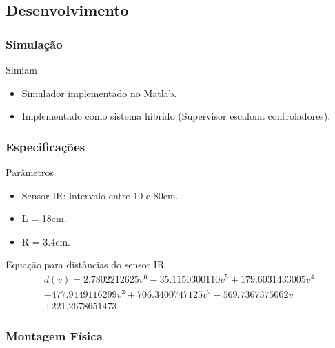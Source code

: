 \subsection{Desenvolvimento}

\begin{frame}
	\frametitle{Simulação}
	\begin{block}{Simiam}
		\begin{itemize}
		  \item Simulador implementado no Matlab.
		  \item Implementado como sistema híbrido (Supervisor escalona controladores).
		\end{itemize}
	\end{block}
	
	\vspace{-3.5cm}
	
\end{frame}

\begin{frame}
	\frametitle{Especificações}
	
		\begin{exampleblock}{Parâmetros}
			\begin{itemize}
			  \item Sensor IR: intervalo entre 10 e 80cm.
			  \item L = 18cm.
			  \item R = 3.4cm.
			\end{itemize}	
		\end{exampleblock}	
		\vspace{-3.2cm}
		\begin{exampleblock}{Equação para distâncias do sensor IR}
			\begin{equation}
				\begin{split}
					d(v) = 2.7802212625 v^6 -35.1150300110 v^5 + 179.6031433005 v^4 \\
					-477.9449116299 v^3 + 706.3400747125 v^2 -569.7367375002 v \\
					+ 221.2678651473
				\end{split}
			\end{equation}
		\end{exampleblock}
\end{frame}

\begin{frame}
	\frametitle{Montagem Física}
	
\end{frame}

\begin{frame}
	
\end{frame}

